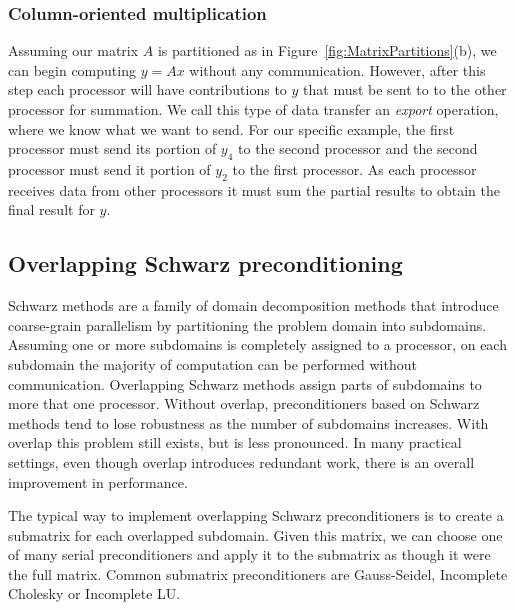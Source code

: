 \documentclass[10pt,relax]{PetraObjectModel}
\begin{document}
\subsubsection{Column-oriented multiplication}
Assuming our matrix $A$ is partitioned as in
Figure~\ref{fig:MatrixPartitions}(b), we can begin computing $y=Ax$
without any communication.  However, after this step each processor
will have contributions to $y$ that must be sent to to the other
processor for summation.  We call this type of
data transfer an {\it export} operation, where we know what we want to
send.  For our specific example, the first processor must send its
portion of $y_4$ to the second processor and the second processor
must send it portion of $y_2$ to the first processor.  As each
processor receives data from other processors it must sum the partial
results to obtain the final result for $y$.



\subsection{Overlapping Schwarz preconditioning}

Schwarz methods are a family of domain decomposition
methods that introduce coarse-grain parallelism by
partitioning the problem domain into subdomains.  Assuming one or more
subdomains is completely assigned to a processor, on each subdomain
the majority of computation can be performed without communication.
Overlapping Schwarz methods assign parts of subdomains to more that
one processor.  Without overlap, preconditioners based on Schwarz
methods tend to lose robustness as the number of subdomains increases.
With overlap this problem still exists, but is less pronounced.  In
many practical settings, even though overlap introduces redundant
work, there is an overall improvement in performance.

The typical way to implement overlapping Schwarz preconditioners is to
create a submatrix for each
overlapped subdomain.  Given this matrix, we can choose one of many
serial preconditioners and apply it to the submatrix as though it were
the full matrix.  Common submatrix preconditioners are Gauss-Seidel,
Incomplete Cholesky or Incomplete LU.
\end{document}
